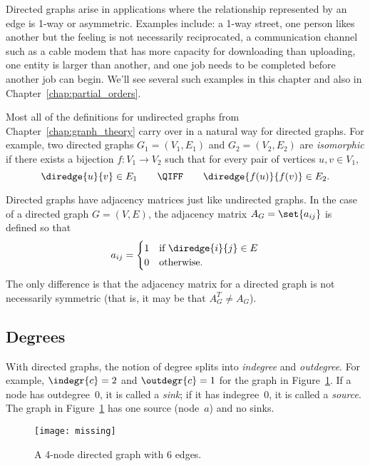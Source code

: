 Directed graphs arise in applications where the relationship
represented by an edge is 1-way or asymmetric.  Examples include: a
1-way street, one person likes another but the feeling is not
necessarily reciprocated, a communication channel such as a cable
modem that has more capacity for downloading than uploading, one
entity is larger than another, and one job needs to be completed
before another job can begin. We'll see several such examples in this
chapter and also in Chapter~\ref{chap:partial_orders}.

Most all of the definitions for undirected graphs from
Chapter~\ref{chap:graph_theory} carry over in a natural way for
directed graphs.  For example, two directed graphs $G_1 = (V_1, E_1)$
and $G_2 = (V_2, E_2)$ are \emph{isomorphic} if there exists a
bijection $f: V_1 \to V_2$ such that for every pair of vertices $u, v
\in V_1$,
\begin{equation*}
    \diredge{u}{v} \in E_1 \qquad \QIFF \qquad \diredge{f(u)}{f(v)} \in E_2.
\end{equation*}

Directed graphs have adjacency matrices just like undirected graphs.
In the case of a directed graph $G = (V, E)$, the adjacency matrix
$A_G = \set{ a_{ij} }$ is defined so that
\begin{equation*}
    a_{ij} = \begin{cases}
                1 & \text{if $\diredge{i}{j} \in E$} \\
                0 & \text{otherwise.}
              \end{cases}
\end{equation*}
The only difference is that the adjacency matrix for a directed graph
is not necessarily symmetric (that is, it may be that
$A_{G}^{T} \ne A_G$).

\subsection{Degrees}

With directed graphs, the notion of degree splits into \emph{indegree}
and \emph{outdegree}.  For example, $\indegr{c} = 2$ and $\outdegr{c}
= 1$ for the graph in Figure~\ref{fig:6EB}.  If a node has
outdegree~0, it is called a \emph{sink}; if it has indegree~0, it is
called a \emph{source}.  The graph in Figure~\ref{fig:6EB} has one
source (node~$a$) and no sinks.

\begin{figure}


\texttt{[image: missing]}

\caption{A 4-node directed graph with 6 edges.}

\label{fig:6EB}

\end{figure}

